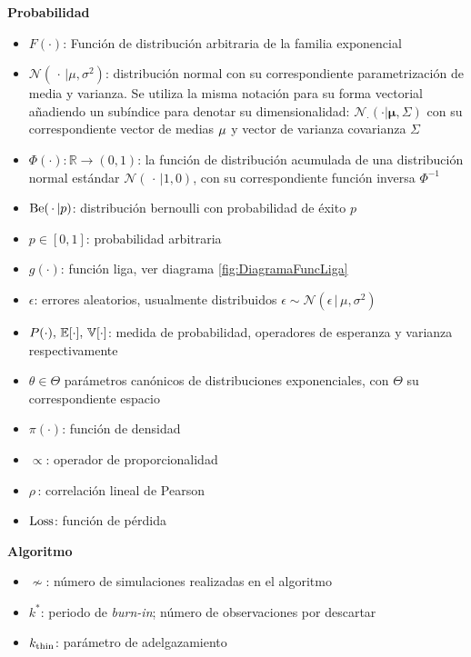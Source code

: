 \documentclass[../../Main/Main.tex]{subfiles}
\begin{document}
\textbf{Probabilidad}
\begin{itemize}[label={}]
	\item $F(\cdot)$: Función de distribución arbitraria de la familia exponencial
	\item $\mathcal{N}(\,\cdot\,|\mu,\sigma^2)$: distribución normal con su correspondiente parametrización de media y varianza. Se utiliza la misma notación para su forma vectorial añadiendo un subíndice para denotar su dimensionalidad: $\mathcal{N}_{\cdot}(\cdot|\bm{\mu},\Sigma)$ con su correspondiente vector de medias $\bf{\mu}$ y vector de varianza covarianza $\Sigma$
	\item $\Phi(\cdot):\mathbb{R}\rightarrow(0,1)$: la función de distribución acumulada de una distribución normal estándar $\mathcal{N}(\,\cdot\,| 1,0)$, con su correspondiente función inversa $\Phi^{-1}$
	\item $\text{Be}(\,\cdot\,|p)$: distribución bernoulli con probabilidad de éxito $p$
	\item $p \in [0,1]$: probabilidad arbitraria
	\item $g(\cdot)$: función liga, ver diagrama \ref{fig:DiagramaFuncLiga}
	\item $\epsilon$: errores aleatorios, usualmente distribuidos $\epsilon\sim\mathcal{N}(\epsilon\,|\,\mu,\sigma^2)$
	\item $P(\cdot),\, \mathbb{E}[\cdot],\, \mathbb{V}[\cdot]$: medida de probabilidad, operadores de esperanza y varianza respectivamente
	\item $\theta \in \Theta$ parámetros canónicos de distribuciones exponenciales, con $\Theta$ su correspondiente espacio
	\item $\pi(\cdot)$: función de densidad
	\item $\propto$: operador de proporcionalidad
	\item $\rho\,$: correlación lineal de Pearson
	\item $\text{Loss}$: función de pérdida
\end{itemize}
	
\textbf{Algoritmo}
\begin{itemize}[label={}]
	\item $\nsim$: número de simulaciones realizadas en el algoritmo
	\item $k^*$:  periodo de \textit{burn-in}; número de observaciones por descartar
	\item $k_{\text{thin}}$: parámetro de adelgazamiento 
\end{itemize}
\end{document}
